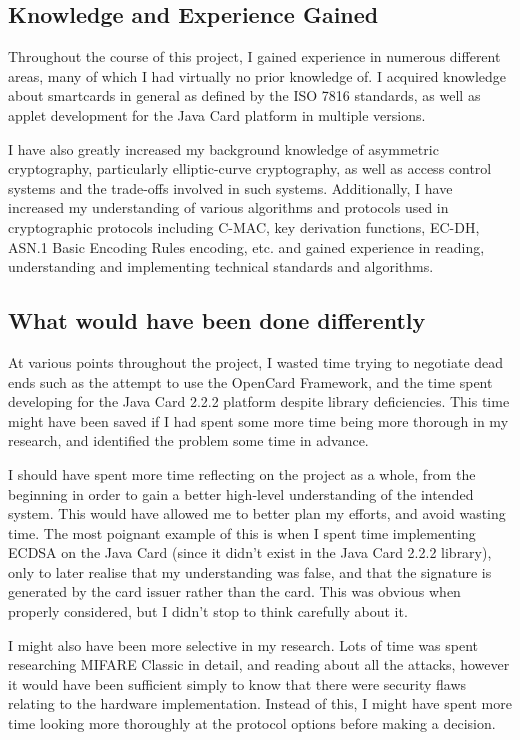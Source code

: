 \documentclass[12pt,a4paper]{article}
\begin{document}
\subsection{Knowledge and Experience Gained}
Throughout the course of this project, I gained experience in numerous different areas, many of which I had virtually no prior knowledge of. I acquired knowledge about smartcards in general as defined by the ISO 7816 standards, as well as applet development for the Java Card platform in multiple versions.

I have also greatly increased my background knowledge of asymmetric cryptography, particularly elliptic-curve cryptography, as well as access control systems and the trade-offs involved in such systems. Additionally, I have increased my understanding of various algorithms and protocols used in cryptographic protocols including C-MAC, key derivation functions, EC-DH, ASN.1 Basic Encoding Rules encoding, etc. and gained experience in reading, understanding and implementing technical standards and algorithms.

\subsection{What would have been done differently}
At various points throughout the project, I wasted time trying to negotiate dead ends such as the attempt to use the OpenCard Framework, and the time spent developing for the Java Card 2.2.2 platform despite library deficiencies. This time might have been saved if I had spent some more time being more thorough in my research, and identified the problem some time in advance.

I should have spent more time reflecting on the project as a whole, from the beginning in order to gain a better high-level understanding of the intended system. This would have allowed me to better plan my efforts, and avoid wasting time. The most poignant example of this is when I spent time implementing ECDSA on the Java Card (since it didn't exist in the Java Card 2.2.2 library), only to later realise that my understanding was false, and that the signature is generated by the card issuer rather than the card. This was obvious when properly considered, but I didn't stop to think carefully about it.

I might also have been more selective in my research. Lots of time was spent researching MIFARE Classic in detail, and reading about all the attacks, however it would have been sufficient simply to know that there were security flaws relating to the hardware implementation. Instead of this, I might have spent more time looking more thoroughly at the protocol options before making a decision.
\end{document}
